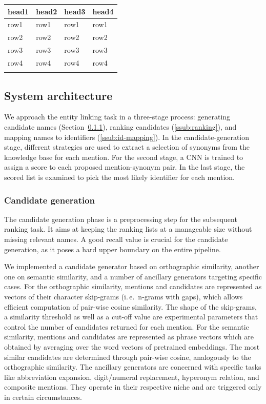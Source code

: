 \documentclass{bioinfo}
\newcommand{\ie}{i.\,e.\ }
\begin{document}
\begin{table}[!t]
{\begin{tabular}{@{}llll@{}}\toprule
head1 & head2 & head3 & head4\\\midrule
row1 & row1 & row1 & row1\\
row2 & row2 & row2 & row2\\
row3 & row3 & row3 & row3\\
row4 & row4 & row4 & row4\\\botrule
\end{tabular}}{}
\end{table}


\subsection{System architecture}

We approach the entity linking task in a three-stage process:
generating candidate names (Section~\ref{ssub:cand-gen}),
ranking candidates (\ref{ssub:ranking}), and
mapping names to identifiers (\ref{ssub:id-mapping}).
In the candidate-generation stage, different strategies are used to extract a selection of synonyms from the knowledge base for each mention.
For the second stage, a CNN is trained to assign a score to each proposed mention-synonym pair.
In the last stage, the scored list is examined to pick the most likely identifier for each mention.

\subsubsection{Candidate generation}
\label{ssub:cand-gen}

The candidate generation phase is a preprocessing step for the subsequent ranking task.
It aims at keeping the ranking lists at a manageable size without missing relevant names.
A good recall value is crucial for the candidate generation, as it poses a hard upper boundary on the entire pipeline.

We implemented a candidate generator based on orthographic similarity, another one on semantic similarity, and a number of ancillary generators targeting specific cases.
For the orthographic similarity, mentions and candidates are represented as vectors of their character skip-grams (\ie n-grams with gaps),  %
which allows efficient computation of pair-wise cosine similarity.
The shape of the skip-grams, a similarity threshold as well as a cut-off value are experimental parameters that control the number of candidates returned for each mention.
For the semantic similarity, mentions and candidates are represented as phrase vectors which are obtained by averaging over the word vectors of pretrained embeddings.
The most similar candidates are determined through pair-wise cosine, analogously to the orthographic similarity.
The ancillary generators are concerned with specific tasks like abbreviation expansion, digit/numeral replacement, hyperonym relation, and composite mentions.
They operate in their respective niche and are triggered only in certain circumstances.
\end{document}
